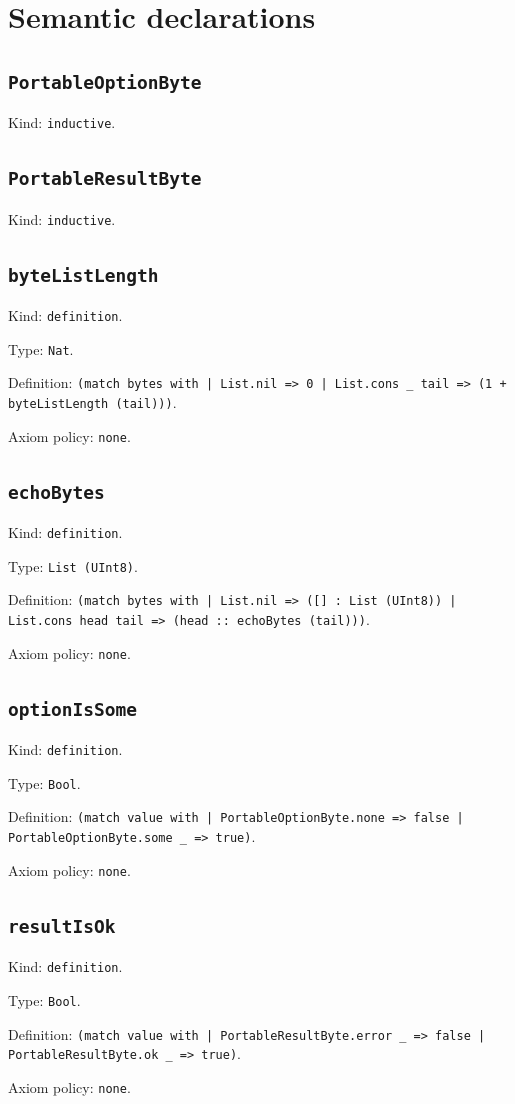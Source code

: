 \documentclass[11pt]{article}
\begin{document}
\section*{Semantic declarations}
\subsection*{\texttt{PortableOptionByte}}
\noindent Kind: \texttt{inductive}.\par
\subsection*{\texttt{PortableResultByte}}
\noindent Kind: \texttt{inductive}.\par
\subsection*{\texttt{byteListLength}}
\noindent Kind: \texttt{definition}.\par
\noindent Type: \texttt{Nat}.\par
\noindent Definition: \texttt{(match bytes with | List.nil => 0 | List.cons \_ tail => (1 + byteListLength (tail)))}.\par
\noindent Axiom policy: \texttt{none}.\par
\subsection*{\texttt{echoBytes}}
\noindent Kind: \texttt{definition}.\par
\noindent Type: \texttt{List (UInt8)}.\par
\noindent Definition: \texttt{(match bytes with | List.nil => ([] : List (UInt8)) | List.cons head tail => (head :: echoBytes (tail)))}.\par
\noindent Axiom policy: \texttt{none}.\par
\subsection*{\texttt{optionIsSome}}
\noindent Kind: \texttt{definition}.\par
\noindent Type: \texttt{Bool}.\par
\noindent Definition: \texttt{(match value with | PortableOptionByte.none => false | PortableOptionByte.some \_ => true)}.\par
\noindent Axiom policy: \texttt{none}.\par
\subsection*{\texttt{resultIsOk}}
\noindent Kind: \texttt{definition}.\par
\noindent Type: \texttt{Bool}.\par
\noindent Definition: \texttt{(match value with | PortableResultByte.error \_ => false | PortableResultByte.ok \_ => true)}.\par
\noindent Axiom policy: \texttt{none}.\par
\end{document}
